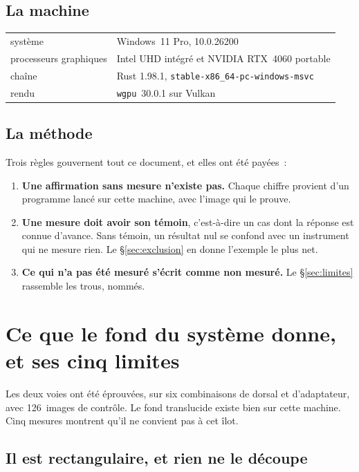 \documentclass[11pt,a4paper]{article}
\newcommand{\uni}[1]{\texttt{#1}}
\begin{document}
\subsection{La machine}

\begin{center}
\begin{tabular}{ll}
\toprule
système & Windows~11 Pro, 10.0.26200 \\
processeurs graphiques & Intel UHD intégré et NVIDIA RTX~4060 portable \\
chaîne & Rust 1.98.1, \uni{stable-x86\_64-pc-windows-msvc} \\
rendu & \uni{wgpu}~30.0.1 sur Vulkan \\
\bottomrule
\end{tabular}
\end{center}

\subsection{La méthode}

Trois règles gouvernent tout ce document, et elles ont été payées~:

\begin{enumerate}
\item \textbf{Une affirmation sans mesure n'existe pas.} Chaque chiffre
provient d'un programme lancé sur cette machine, avec l'image qui le prouve.
\item \textbf{Une mesure doit avoir son témoin}, c'est-à-dire un cas dont la
réponse est connue d'avance. Sans témoin, un résultat nul se confond avec un
instrument qui ne mesure rien. Le §\ref{sec:exclusion} en donne l'exemple le
plus net.
\item \textbf{Ce qui n'a pas été mesuré s'écrit comme non mesuré.} Le
§\ref{sec:limites} rassemble les trous, nommés.
\end{enumerate}

\section{Ce que le fond du système donne, et ses cinq limites}

Les deux voies ont été éprouvées, sur six combinaisons de dorsal et
d'adaptateur, avec 126~images de contrôle. Le fond translucide existe bien sur
cette machine. Cinq mesures montrent qu'il ne convient pas à cet îlot.

\subsection{Il est rectangulaire, et rien ne le découpe}
\label{sec:rectangle}
\end{document}
